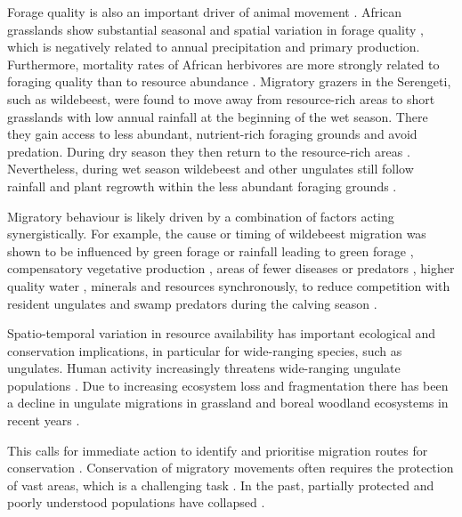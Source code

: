 \documentclass[12pt,a4paper, twoside, english]{article}
\begin{document}
Forage quality is also an important driver of animal movement \citep{Berger2004, Schweiger2015}. African grasslands show substantial seasonal and spatial variation in forage quality \citep{Breman1983}, which is negatively related to annual precipitation and primary production. Furthermore, mortality rates of African herbivores are more strongly related to foraging quality than to resource abundance \citep{Fryxell1987, Sinclair1985}. Migratory grazers in the Serengeti, such as wildebeest, were found to move away from resource-rich areas to short grasslands with low annual rainfall at the beginning of the wet season. There they gain access to less abundant, nutrient-rich foraging grounds and avoid predation. During dry season they then return to the resource-rich areas \citep{Fryxell1988, Coughenour1991}. 
Nevertheless, during wet season wildebeest and other ungulates still follow rainfall and plant regrowth within the less abundant foraging grounds \citep{McNaughton1985, Durant1988}.

Migratory behaviour is likely driven by a combination of factors acting synergistically. For example, the cause or timing of wildebeest migration was shown to be influenced by green forage \citep{Boone2006} or rainfall leading to green forage \citep{Talbot1963}, compensatory vegetative production \citep{McNaughton1976}, areas of fewer diseases or predators \citep{Darling1960, Fryxell1988}, higher quality water \citep{Gereta1998}, minerals \citep{Kreulen1975} and resources synchronously, to reduce competition with resident ungulates and swamp predators during the calving season \citep{Estes1976}.

Spatio-temporal variation in resource availability has important ecological and conservation implications, in particular for wide-ranging species, such as ungulates. Human activity increasingly threatens wide-ranging ungulate populations \citep{Berger2004, Harris2009}. Due to increasing ecosystem loss and fragmentation there has been a decline in ungulate migrations in grassland and boreal woodland ecosystems in recent years \citep{Bartlam-Brooks2011, Bartlam-Brooks2013, Olson2010}. 

This calls for immediate action to identify and prioritise migration routes for conservation \citep{Sawyer2009}. Conservation of migratory movements often requires the protection of vast areas, which is a challenging task \citep{Thirgood2004}. 
In the past, partially protected and poorly understood populations have collapsed \citep{Bolger2008, Harris2009}. 
\end{document}
